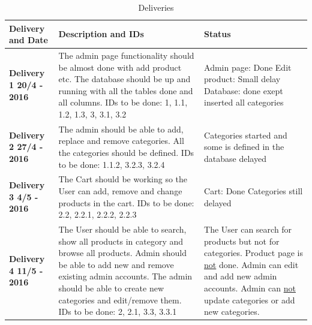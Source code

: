 \documentclass[a4paper,12pt]{article}
\begin{document}
\begin{table}[htbp]
	\centering
	\caption{Deliveries}
	\label{my-label}
	\begin{tabular}{|L{4cm}|L{7cm}|L{4cm}|}
		\hline
		\textbf{Delivery and Date}& \textbf{Description and IDs}                                                                                                                                                                                                                                                                                   & \textbf{Status} \\ \hline
		\textbf{Delivery 1  20/4 - 2016} & The admin page functionality should be almost done with add product etc. \newline The database should be up and running with all the tables done and all columns. \newline IDs to be done: 1, 1.1, 1.2, 1.3, 3, 3.1, 3.2                                                                  &     Admin page: Done \newline Edit product: Small delay \newline Database: done exept inserted all categories            \\ \hline
		\textbf{Delivery 2 27/4 - 2016} & The admin should be able to add, replace and remove categories. \newline All the categories should be defined. \newline IDs to be done: 1.1.2, 3.2.3, 3.2.4                                                                                                                                            &  Categories started and some is defined in the database  delayed           \\ \hline
		\textbf{Delivery 3 4/5 - 2016}  & The Cart should be working so the User can add, remove and change products in the cart. \newline IDs to be done: 2.2, 2.2.1, 2.2.2, 2.2.3                                                                                                                                                      &  Cart: Done \newline Categories still delayed                \\ \hline
		\textbf{Delivery 4 11/5 - 2016} & The User should be able to search, show all products in category and browse all products. \newline Admin should be able to add new and remove existing admin accounts. \newline The admin should be able to create new categories and edit/remove them. \newline IDs to be done: 2, 2.1, 3.3, 3.3.1          &  The User can search for products but not for categories. \newline Product page is \underline{not} done. \newline Admin can edit and add new admin accounts. \newline Admin can \underline{not} update categories or add new categories.              \\ \hline

\end{tabular}
\end{table}
\end{document}
